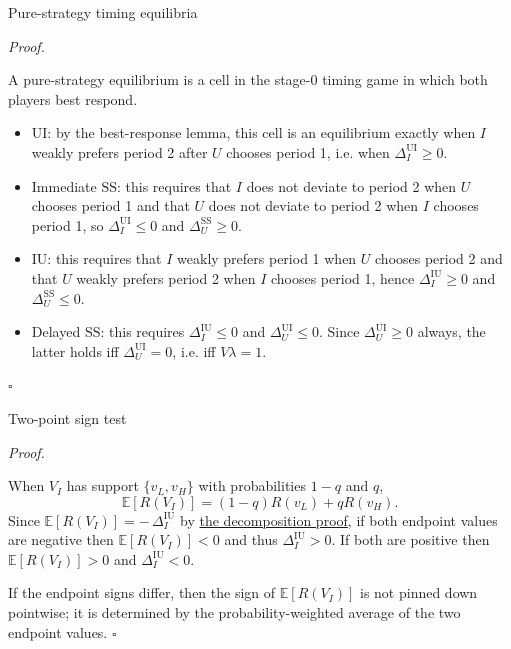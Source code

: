 \documentclass[10pt]{beamer}
\newcommand{\E}{\mathbb{E}}
\newcommand{\rSS}{\mathrm{SS}}
\newcommand{\rUI}{\mathrm{UI}}
\newcommand{\rIU}{\mathrm{IU}}
\renewenvironment{proof}{%
  \par\smallskip\noindent\textit{Proof.}\hspace{0.6em}\ignorespaces
}{%
  \unskip\nobreak\hfill$\square$\par\smallskip
}
\begin{document}
\begin{frame}[allowframebreaks]{Pure-strategy timing equilibria}\label{prf:timing}
  \begin{proof}
    A pure-strategy equilibrium is a cell in the stage-0 timing game in
    which both players best respond.

    \begin{itemize}
      \item $\rUI$: by the best-response lemma, this cell is an
            equilibrium exactly when $I$ weakly prefers period 2 after
            $U$ chooses period 1, i.e. when $\Delta_I^{\rUI} \ge 0$.
      \item Immediate $\rSS$: this requires that $I$ does not deviate
            to period 2 when $U$ chooses period 1 and that $U$ does not
            deviate to period 2 when $I$ chooses period 1, so
            $\Delta_I^{\rUI} \le 0$ and $\Delta_U^{\rSS} \ge 0$.
      \item $\rIU$: this requires that $I$ weakly prefers period 1 when
            $U$ chooses period 2 and that $U$ weakly prefers period 2
            when $I$ chooses period 1, hence $\Delta_I^{\rIU} \ge 0$
            and $\Delta_U^{\rSS} \le 0$.
      \item Delayed $\rSS$: this requires
            $\Delta_I^{\rIU} \le 0$ and $\Delta_U^{\rUI} \le 0$. Since
            $\Delta_U^{\rUI} \ge 0$ always, the latter holds iff
            $\Delta_U^{\rUI} = 0$, i.e. iff $V\lambda = 1$.
    \end{itemize}
  \end{proof}
\end{frame}

\begin{frame}{Two-point sign test}\label{prf:two-point}
  \begin{proof}
    When $V_I$ has support $\{v_L,v_H\}$ with probabilities
    $1-q$ and $q$,
    \[
      \E[R(V_I)] = (1-q)R(v_L) + qR(v_H).
    \]
    Since $\E[R(V_I)] = -\,\Delta_I^{\rIU}$ by
    \hyperref[prf:rv]{the decomposition proof}, if both endpoint values
    are negative then $\E[R(V_I)] < 0$ and thus $\Delta_I^{\rIU} > 0$.
    If both are positive then $\E[R(V_I)] > 0$ and
    $\Delta_I^{\rIU} < 0$.

    If the endpoint signs differ, then the sign of $\E[R(V_I)]$ is not
    pinned down pointwise; it is determined by the probability-weighted
    average of the two endpoint values.
  \end{proof}
\end{frame}
\end{document}
